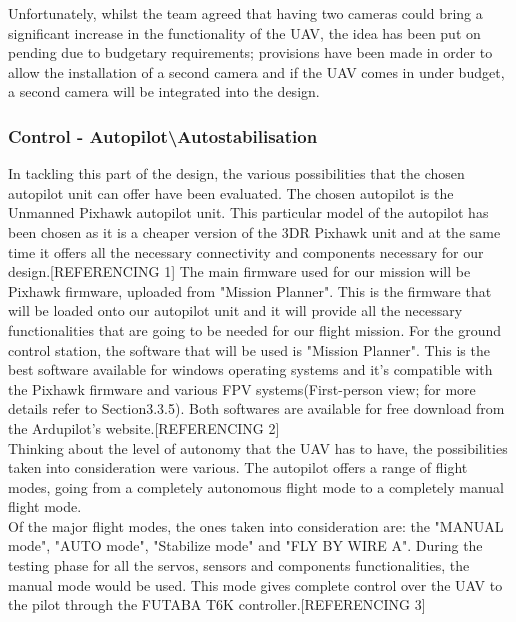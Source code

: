 \documentclass[12pt]{article}
\begin{document}
\noindent Unfortunately, whilst the team agreed that having two cameras could bring a significant increase in the functionality of the UAV, the idea has been put on pending due to budgetary requirements; provisions have been made in order to allow the installation of a second camera and if the UAV comes in under budget, a second camera will be integrated into the design. \\

\subsubsection{Control - Autopilot\textbackslash Autostabilisation}

\noindent In tackling this part of the design, the various possibilities that the chosen autopilot unit can offer have been evaluated.  The chosen autopilot is the Unmanned Pixhawk autopilot unit. This particular model of the autopilot has been chosen as it is a cheaper version of the 3DR Pixhawk unit and at the same time it offers all the necessary connectivity and components necessary for our design.[REFERENCING 1] The main firmware used for our mission will be Pixhawk firmware, uploaded from "Mission Planner". This is the firmware that will be loaded onto our autopilot unit and it will provide all the necessary functionalities that are going to be needed for our flight mission. For the ground control station, the software that will be used is "Mission Planner". This is the best software available for windows operating systems and it's compatible with the Pixhawk firmware and various FPV systems(First-person view; for more details refer to Section3.3.5). Both softwares are available for free download from the Ardupilot's website.[REFERENCING 2] \\

\noindent Thinking about the level of autonomy that the UAV has to have, the possibilities taken into consideration were various. The autopilot offers a range of flight modes, going from a completely autonomous flight mode to a completely manual flight mode. \\

\noindent Of the major flight modes, the ones taken into consideration are: the "MANUAL mode", "AUTO mode", "Stabilize mode" and "FLY BY WIRE A". During the testing phase for all the servos, sensors and components functionalities, the manual mode would be used. This mode gives complete control over the UAV to the pilot through the FUTABA T6K controller.[REFERENCING 3] \\
\end{document}

